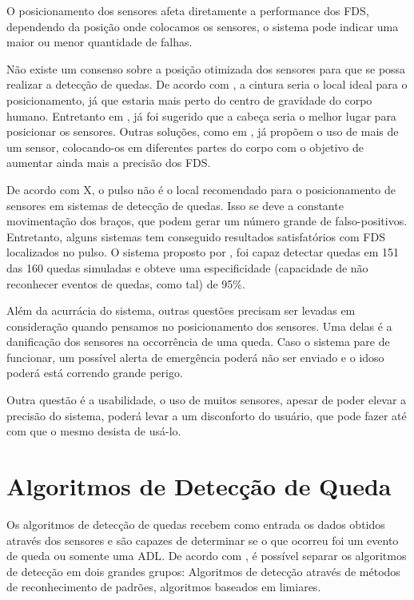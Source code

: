O posicionamento dos sensores afeta diretamente a performance dos \ac{FDS}, dependendo da posição onde colocamos os sensores, o sistema pode indicar uma maior ou menor quantidade de falhas. 

Não existe um consenso sobre a posição otimizada dos sensores para que se possa realizar a detecção de quedas. De acordo com \cite{abbate2011recognition}, a cintura seria o local ideal para o posicionamento, já que estaria mais perto do centro de gravidade do corpo humano. Entretanto em \cite{kangas2007determination}, já foi sugerido que a cabeça seria o melhor lugar para posicionar os sensores. Outras soluções, como em \cite{gjoreski2011accelerometer}, já propõem o uso de mais de um sensor, colocando-os em diferentes partes do corpo com o objetivo de aumentar ainda mais a precisão dos \ac{FDS}.


De acordo com X, o pulso não é o local recomendado para o posicionamento de sensores em sistemas de detecção de quedas. Isso se deve  a constante movimentação dos braços, que podem gerar um número grande de falso-positivos. Entretanto, alguns sistemas tem conseguido resultados satisfatórios com \ac{FDS} localizados no pulso. O sistema proposto por \cite{hsieh2014wrist}, foi capaz detectar quedas em 151 das 160 quedas simuladas e obteve uma especificidade (capacidade de não reconhecer eventos de quedas, como tal) de 95\%.

Além da acurrácia do sistema, outras questões precisam ser levadas em consideração quando pensamos no posicionamento dos sensores. Uma delas é a danificação dos sensores na occorrência de uma queda. Caso o sistema pare de funcionar, um possível alerta de emergência poderá não ser enviado e o idoso poderá está correndo grande perigo. 

Outra questão é a usabilidade, o uso de muitos sensores, apesar de poder elevar a precisão do sistema, poderá levar a um disconforto do usuário, que pode fazer até com que o mesmo desista de usá-lo. 


\section{Algoritmos de Detecção de Queda}
\label{sec: FDS_algorithm}
Os algoritmos de detecção de quedas recebem como entrada os dados obtidos através dos sensores e são capazes de determinar se o que ocorreu foi um evento de queda ou somente uma \ac{ADL}. De acordo com \cite{casilari2015analysis}, é possível separar os algoritmos de detecção em dois grandes grupos: Algoritmos de detecção através de métodos de reconhecimento de padrões, algoritmos baseados em limiares. 




